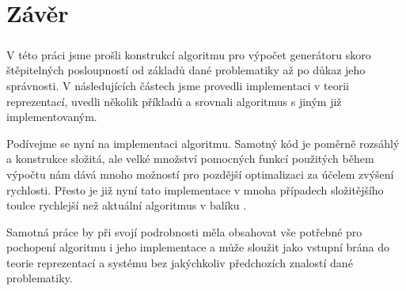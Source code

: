 \chapter{Závěr}

\paragraph{ } V této práci jsme prošli konstrukcí algoritmu pro výpočet generátoru skoro štěpitelných posloupností 
od základů dané problematiky až po důkaz jeho správnosti. V následujících částech jsme 
provedli implementaci v teorii reprezentací, uvedli několik příkladů a srovnali 
algoritmus s jiným již implementovaným.

Podívejme se nyní na implementaci algoritmu. Samotný kód je poměrně rozsáhlý a konstrukce složitá, 
ale velké množství pomocných funkcí použitých během výpočtu nám dává mnoho možností pro pozdější
optimalizaci za účelem zvýšení rychlosti. Přesto je již nyní tato implementace v mnoha případech složitějšího
toulce rychlejší než aktuální algoritmus v balíku \cite{QPA}. 

Samotná práce by při svojí podrobnosti měla obsahovat vše potřebné pro pochopení algoritmu i jeho implementace 
a může sloužit jako vstupní brána do teorie reprezentací a systému \cite{GAP4} bez 
jakýchkoliv
předchozích znalostí dané problematiky.